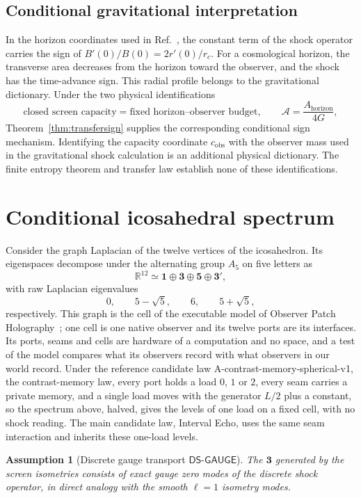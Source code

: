 \documentclass[11pt]{article}
\newtheorem{assumption}[theorem]{Assumption}
\theoremstyle{remark}
\newcommand{\R}{\mathbb R}
\begin{document}
\subsection{Conditional gravitational interpretation}

In the horizon coordinates used in
Ref.~\cite{chenStanfordTangYang2026}, the constant term of the shock operator
carries the sign of \(B'(0)/B(0)=2r'(0)/r_c\). For a cosmological horizon,
the transverse area decreases from the horizon toward the observer, and the
shock has the time-advance sign. This radial profile belongs to the
gravitational dictionary. Under the two physical identifications
\[
\text{closed screen capacity}=\text{fixed horizon--observer budget},
\qquad
\mathcal A=\frac{A_{\mathrm{horizon}}}{4G},
\]
Theorem~\ref{thm:transfersign} supplies the corresponding conditional sign
mechanism. Identifying the capacity coordinate \(c_{\mathrm{obs}}\) with the
observer mass used in the gravitational shock calculation is an additional
physical dictionary. The finite entropy theorem and transfer law establish
none of these identifications.

\section{Conditional icosahedral spectrum}
\label{sec:spectrum}

Consider the graph Laplacian of the twelve vertices of the icosahedron. Its
eigenspaces decompose under the alternating group \(A_5\) on five letters as
\[
\R^{12}\simeq\mathbf1\oplus\mathbf3\oplus\mathbf5\oplus\mathbf3',
\]
with raw Laplacian eigenvalues
\[
0,\qquad 5-\sqrt5,\qquad 6,\qquad 5+\sqrt5,
\]
respectively. This graph is the cell of the executable model of Observer
Patch Holography~\cite{ophmodel}; one cell is one native observer and its
twelve ports are its interfaces. Its ports, seams and cells are hardware of a computation and no space, and a test of the model compares what its observers record with what observers in our world record. Under the reference
candidate law A-contrast-memory-spherical-v1, the contrast-memory law, every port holds a load \(0\),
\(1\) or \(2\), every seam carries a private memory, and a
single load moves with the generator \(L/2\) plus a constant, so the
spectrum above, halved, gives the levels of one load on a fixed cell, with
no shock reading. The main candidate law, Interval Echo, uses the same seam
interaction and inherits these one-load levels.

\begin{assumption}[Discrete gauge transport
\(\mathsf{DS\text{-}GAUGE}\)]
\label{ass:dsgauge}
The \(\mathbf3\) generated by the screen isometries consists of exact gauge
zero modes of the discrete shock operator, in direct analogy with the smooth
\(\ell=1\) isometry modes.
\end{assumption}
\end{document}
